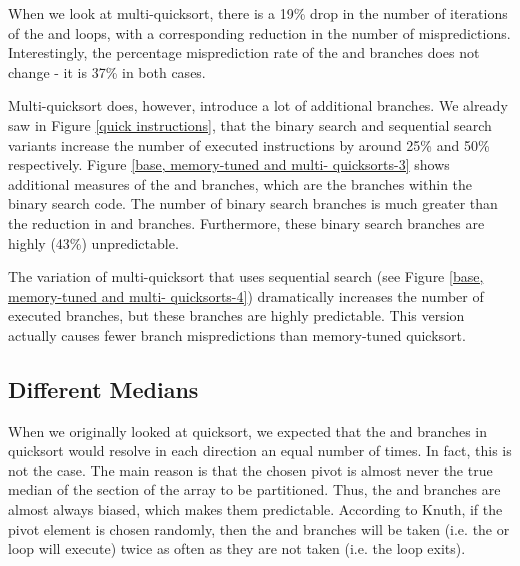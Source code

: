 When we look at multi-quicksort, there is a 19\% drop in the number of
iterations of the  and  loops, with a corresponding reduction in the
number of mispredictions. Interestingly, the percentage misprediction rate of
the  and  branches does not change - it is 37\% in both cases.



Multi-quicksort does, however, introduce a lot of additional branches. We
already saw in Figure \ref{quick instructions}, that the binary search and
sequential search variants increase the number of executed instructions by
around 25\% and 50\% respectively. Figure \ref{base, memory-tuned and multi-
quicksorts-3} shows additional measures of the  and  branches, which are the branches within the binary search code. The
number of binary search branches is much greater than the reduction in 
and  branches. Furthermore, these binary search branches are highly (43\%)
unpredictable.

The variation of multi-quicksort that uses sequential search (see Figure
\ref{base, memory-tuned and multi- quicksorts-4}) dramatically increases the
number of executed branches, but these branches are highly predictable. This
version actually causes fewer branch mispredictions than memory-tuned quicksort.

\subsection{Different Medians}

\label{quick-predictors2}

\label{quicksort entropy}
When we originally looked at quicksort, we expected that the  and 
branches in quicksort would resolve in each direction an equal number of times.
In fact, this is not the case. The main reason is that the chosen pivot is
almost never the true median of the section of the array to be partitioned.
Thus, the  and  branches are almost always biased, which makes them
predictable. According to Knuth, if the pivot element is chosen randomly, then
the  and  branches will be taken (i.e. the  or  loop will
execute) twice as often as they are not taken (i.e. the loop exits).


